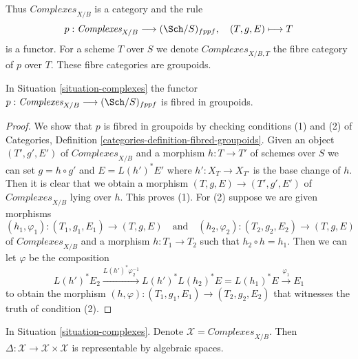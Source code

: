 \noindent
Thus $\textit{Complexes}_{X/B}$ is a category and the rule
$$
p : \textit{Complexes}_{X/B} \longrightarrow (\Sch/S)_{fppf},
\quad
(T, g, E) \longmapsto T
$$
is a functor. For a scheme $T$ over $S$ we denote $\textit{Complexes}_{X/B, T}$
the fibre category of $p$ over $T$. These fibre categories are groupoids.

\begin{lemma}
\label{lemma-complexes-fibred-in-groupoids}
In Situation \ref{situation-complexes} the functor
$p : \textit{Complexes}_{X/B} \longrightarrow (\Sch/S)_{fppf}$
is fibred in groupoids.
\end{lemma}

\begin{proof}
We show that $p$ is fibred in groupoids by checking conditions
(1) and (2) of Categories, Definition
\ref{categories-definition-fibred-groupoids}.
Given an object $(T', g', E')$
of $\textit{Complexes}_{X/B}$ and a morphism $h : T \to T'$ of
schemes over $S$ we can set $g = h \circ g'$ and
$E = L(h')^*E'$ where $h' : X_T \to X_{T'}$
is the base change of $h$. Then it is clear that we obtain
a morphism $(T, g, E) \to (T', g', E')$
of $\textit{Complexes}_{X/B}$ lying over $h$. This proves (1).
For (2) suppose we are given morphisms
$$
(h_1, \varphi_1) : (T_1, g_1, E_1) \to (T, g, E)
\quad\text{and}\quad
(h_2, \varphi_2) : (T_2, g_2, E_2) \to (T, g, E)
$$
of $\textit{Complexes}_{X/B}$ and a morphism $h : T_1 \to T_2$ such that
$h_2 \circ h = h_1$. Then we can let $\varphi$ be the composition
$$
L(h')^*E_2
\xrightarrow{L(h')^*\varphi_2^{-1}}
L(h')^*L(h_2)^*E = L(h_1)^*E
\xrightarrow{\varphi_1}
E_1
$$
to obtain the morphism
$(h, \varphi) : (T_1, g_1, E_1) \to (T_2, g_2, E_2)$
that witnesses the truth of condition (2).
\end{proof}

\begin{lemma}
\label{lemma-complexes-diagonal}
In Situation \ref{situation-complexes}. Denote
$\mathcal{X} = \textit{Complexes}_{X/B}$. Then
$\Delta : \mathcal{X} \to \mathcal{X} \times \mathcal{X}$ is
representable by algebraic spaces.
\end{lemma}

